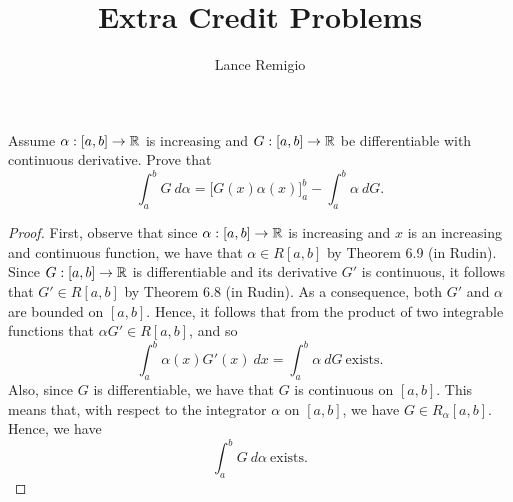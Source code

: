 \documentclass[a4paper]{article}
\title{Extra Credit Problems}
\author{Lance Remigio}
\begin{document}
\maketitle

\begin{problem}
    Assume \( \alpha: [a,b] \to \mathbb{R}  \) is increasing and \( G : [a,b] \to \mathbb{R}  \) be differentiable with continuous derivative. Prove that 
    \[  \int_{ a }^{ b }  G  \ d \alpha = \Big[ G(x) \alpha(x) \Big]_{a}^{b} - \int_{ a }^{ b }  \alpha  \ d G. \tag{*} \]
\end{problem}
\begin{proof}
    First, observe that since \( \alpha:[a,b] \to \mathbb{R}   \) is increasing and \( x  \) is an increasing and continuous function, we have that \( \alpha \in R[a,b] \) by Theorem 6.9 (in Rudin). Since \( G:[a,b] \to \mathbb{R}    \) is differentiable and its derivative \( G'  \) is continuous, it follows that \( G' \in R[a,b] \) by Theorem 6.8 (in Rudin). As a consequence, both \( G' \) and \( \alpha \) are bounded on \( [a,b] \). Hence, it follows that from the product of two integrable functions that \( \alpha G' \in R[a,b]  \), and so  
    \[  \int_{ a }^{ b }  \alpha(x) G'(x) \  dx = \int_{ a }^{ b }  \alpha  \ dG  \  \text{exists.}  \tag{1} \]
   Also, since \( G  \) is differentiable, we have that \( G  \) is continuous on \( [a,b] \). This means that, with respect to the integrator \( \alpha  \) on \( [a,b] \), we have \( G \in {R}_{\alpha}[a,b] \). Hence, we have  
   \[ \int_{ a }^{ b }  G  \ d \alpha \  \text{exists}. \tag{2} \]


\end{proof}
\end{document}
